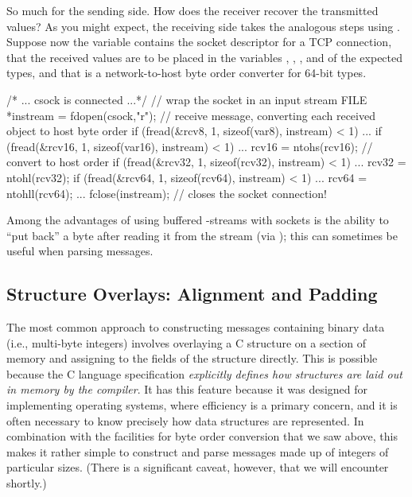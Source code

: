 So much for the sending side.  How does the receiver recover the
transmitted values?  As you might expect, the receiving side takes the
analogous steps using .  Suppose now the variable 
contains the socket descriptor for a TCP connection, that the
received values are to be placed in the variables ,
, , and  of the expected types, and
that  is a network-to-host byte order converter for
64-bit types.

\begin{inlinecode}
  /* ... csock is connected ...*/
  // wrap the socket in an input stream
  FILE *instream = fdopen(csock,"r");
  // receive message, converting each received object to host byte order
  if (fread(&rcv8, 1, sizeof(var8), instream) < 1) ...
  if (fread(&rcv16, 1, sizeof(var16), instream) <  1) ...
  rcv16 = ntohs(rcv16); // convert to host order
  if (fread(&rcv32, 1, sizeof(rcv32), instream) < 1) ...
  rcv32 = ntohl(rcv32);
  if (fread(&rcv64, 1, sizeof(rcv64), instream) < 1) ...
  rcv64 = ntohll(rcv64);
  ...
  fclose(instream); // closes the socket connection!
\end{inlinecode}

Among the advantages of using buffered -streams with sockets
is the ability to ``put back'' a byte after reading it from the
stream (via );
this can sometimes be useful when parsing messages.

\subsection{Structure Overlays: Alignment and Padding}
\label{sect:overlay}
The most common approach to constructing messages containing
binary data (i.e., multi-byte integers) involves overlaying a
C structure on a section of memory and assigning to the fields of the
structure directly.  This is possible because
the C language specification \emph{explicitly defines how structures
are laid out in memory by the compiler}.
It has this feature because it was designed for
implementing operating systems, where efficiency is a primary concern,
and it is often necessary to know precisely how data
structures are represented.
%
In combination with the facilities for byte order
conversion that we saw above, this makes it rather simple to construct
and parse messages made up of integers of particular sizes.  (There is
a significant caveat, however, that we will encounter shortly.)

